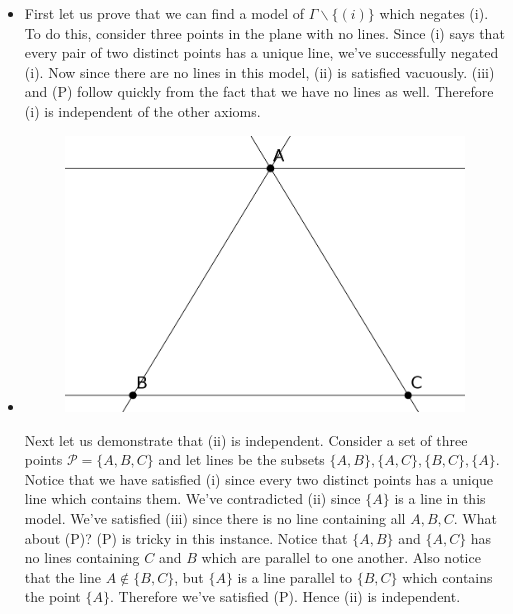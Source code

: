 \documentclass[12pt]{book}
\def\cP{{\mathcal{P}}}
\begin{document}
\begin{itemize}
\item First let us prove that we can find a model of $\Gamma\backslash\{(i)\}$ which negates (i). To do this, consider three points in the plane with no lines. Since (i) says that every pair of two distinct points has a unique line, we've successfully negated (i). Now since there are no lines in this model, (ii) is satisfied vacuously. (iii) and (P) follow quickly from the fact that we have no lines as well. Therefore (i) is independent of the other axioms.

\item 
	\parbox[t]{\dimexpr\textwidth-\leftmargin}{%
      \vspace{-2.5mm}
      \begin{figure}
        \centering
        \vspace{-\baselineskip}
        \includegraphics[width=\linewidth]{images/i2independence.png}
      \end{figure}
      Next let us demonstrate that (ii) is independent. Consider a set of three points $\cP=\{A,B,C\}$ and let lines be the subsets $\{A,B\},\{A,C\},\{B,C\},\{A\}$. Notice that we have satisfied (i) since every two distinct points has a unique line which contains them. We've contradicted (ii) since $\{A\}$ is a line in this model. We've satisfied (iii) since there is no line containing all $A,B,C$. What about (P)? (P) is tricky in this instance. Notice that $\{A,B\}$ and $\{A,C\}$ has no lines containing $C$ and $B$ which are parallel to one another. Also notice that the line $A\notin\{B,C\}$, but $\{A\}$ is a line parallel to $\{B,C\}$ which contains the point $\{A\}$. Therefore we've satisfied (P). Hence (ii) is independent.
    }


\end{itemize}
\end{document}
